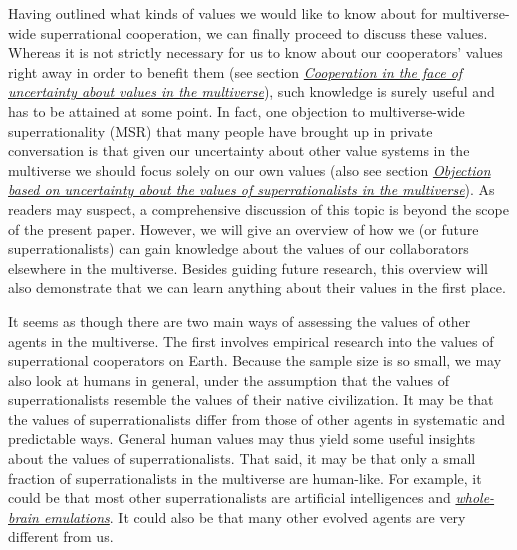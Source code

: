 Having outlined what kinds of values we would like to know about for
multiverse-wide superrational cooperation, we can finally proceed to
discuss these values. Whereas it is not strictly necessary for us to
know about our cooperators' values right away in order to benefit them
(see section
\protect\hyperlink{cooperation-in-the-face-of-uncertainty-about-values}{\emph{Cooperation
in the face of uncertainty about values in the multiverse}}), such
knowledge is surely useful and has to be attained at some point. In
fact, one objection to multiverse-wide superrationality (MSR) that many
people have brought up in private conversation is that given our
uncertainty about other value systems in the multiverse we should focus
solely on our own values (also see section
\protect\hyperlink{objection-based-on-uncertainty-about-the-values-of-superrationalists-in-the-multiverse}{\emph{Objection
based on uncertainty about the values of superrationalists in the
multiverse}}). As readers may suspect, a comprehensive discussion of
this topic is beyond the scope of the present paper. However, we will
give an overview of how we (or future superrationalists) can gain
knowledge about the values of our collaborators elsewhere in the
multiverse. Besides guiding future research, this overview will also
demonstrate that we can learn anything about their values in the first
place.

It seems as though there are two main ways of assessing the values of
other agents in the multiverse. The first involves empirical research
into the values of superrational cooperators on Earth. Because the
sample size is so small, we may also look at humans in general, under
the assumption that the values of superrationalists resemble the values
of their native civilization. It may be that the values of
superrationalists differ from those of other agents in systematic and
predictable ways. General human values may thus yield some useful
insights about the values of superrationalists. That said, it may be
that only a small fraction of superrationalists in the multiverse are
human-like. For example, it could be that most other superrationalists
are artificial intelligences and
\href{https://en.wikipedia.org/wiki/Mind_uploading}{\emph{whole-brain
emulations}}. It could also be that many other evolved agents are very
different from us.

